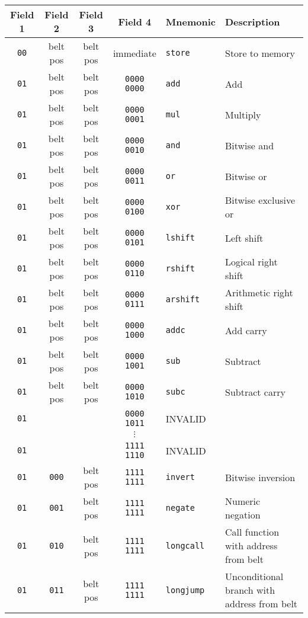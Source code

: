 \documentclass{article}
\begin{document}
	\begin{longtable}{c c c c l l}
		Field 1 & Field 2 & Field 3 & Field 4 & Mnemonic & Description \\
		\midrule
		\texttt{00} & belt pos & belt pos & immediate & \texttt{store} & Store to memory \\

		\texttt{01} & belt pos & belt pos & \texttt{0000 0000} & \texttt{add} & Add \\
		\texttt{01} & belt pos & belt pos & \texttt{0000 0001} & \texttt{mul} & Multiply \\
		\texttt{01} & belt pos & belt pos & \texttt{0000 0010} & \texttt{and} & Bitwise and \\
		\texttt{01} & belt pos & belt pos & \texttt{0000 0011} & \texttt{or} & Bitwise or \\
		\texttt{01} & belt pos & belt pos & \texttt{0000 0100} & \texttt{xor} & Bitwise exclusive or \\
		\texttt{01} & belt pos & belt pos & \texttt{0000 0101} & \texttt{lshift} & Left shift \\
		\texttt{01} & belt pos & belt pos & \texttt{0000 0110} & \texttt{rshift} & Logical right shift \\
		\texttt{01} & belt pos & belt pos & \texttt{0000 0111} & \texttt{arshift} & Arithmetic right shift \\
		\texttt{01} & belt pos & belt pos & \texttt{0000 1000} & \texttt{addc} & Add carry \\
		\texttt{01} & belt pos & belt pos & \texttt{0000 1001} & \texttt{sub} & Subtract \\
		\texttt{01} & belt pos & belt pos & \texttt{0000 1010} & \texttt{subc} & Subtract carry \\
		\texttt{01} & & & \texttt{0000 1011} & INVALID & \\
		            & & & \(\vdots\)         &         & \\
		\texttt{01} & & & \texttt{1111 1110} & INVALID & \\
		\texttt{01} & \texttt{000} & belt pos & \texttt{1111 1111} & \texttt{invert} & Bitwise inversion \\
		\texttt{01} & \texttt{001} & belt pos & \texttt{1111 1111} & \texttt{negate} & Numeric negation \\
		\texttt{01} & \texttt{010} & belt pos & \texttt{1111 1111} & \texttt{longcall} & Call function with address from belt \\
		\texttt{01} & \texttt{011} & belt pos & \texttt{1111 1111} & \texttt{longjump} & Unconditional branch with address from belt \\

\end{longtable}
\end{document}
